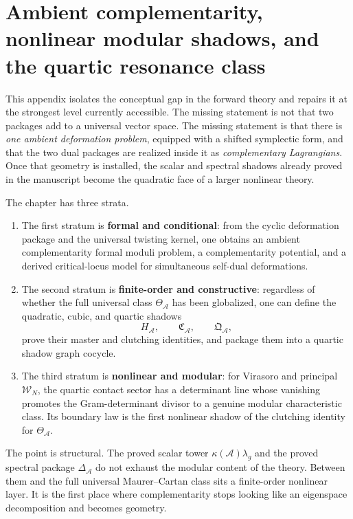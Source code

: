 \documentclass[11pt,oneside]{memoir}
\numberwithin{equation}{chapter}
\theoremstyle{definition}
\newcommand{\cA}{\mathcal A}
\begin{document}
\appendix

\chapter[Ambient complementarity and nonlinear modular shadows]{Ambient complementarity, nonlinear modular shadows, and the quartic resonance class}
\label{app:nonlinear-modular-shadows}

This appendix isolates the conceptual gap in the forward theory and repairs it at the strongest level currently accessible.  The missing statement is not that two packages add to a universal vector space.  The missing statement is that there is \emph{one ambient deformation problem}, equipped with a shifted symplectic form, and that the two dual packages are realized inside it as \emph{complementary Lagrangians}.  Once that geometry is installed, the scalar and spectral shadows already proved in the manuscript become the quadratic face of a larger nonlinear theory.

The chapter has three strata.
\begin{enumerate}[label=\textup{(\roman*)}]
\item The first stratum is \textbf{formal and conditional}: from the cyclic deformation package and the universal twisting kernel, one obtains an ambient complementarity formal moduli problem, a complementarity potential, and a derived critical-locus model for simultaneous self-dual deformations.
\item The second stratum is \textbf{finite-order and constructive}: regardless of whether the full universal class $\Theta_{\cA}$ has been globalized, one can define the quadratic, cubic, and quartic shadows
\[
H_{\cA},\qquad \mathfrak C_{\cA},\qquad \mathfrak Q_{\cA},
\]
prove their master and clutching identities, and package them into a quartic shadow graph cocycle.
\item The third stratum is \textbf{nonlinear and modular}: for Virasoro and principal $\mathcal W_N$, the quartic contact sector has a determinant line whose vanishing promotes the Gram-determinant divisor to a genuine modular characteristic class.  Its boundary law is the first nonlinear shadow of the clutching identity for $\Theta_{\cA}$.
\end{enumerate}

The point is structural.  The proved scalar tower $\kappa(\cA)\lambda_g$ and the proved spectral package $\Delta_{\cA}$ do not exhaust the modular content of the theory.  Between them and the full universal Maurer--Cartan class sits a finite-order nonlinear layer.  It is the first place where complementarity stops looking like an eigenspace decomposition and becomes geometry.
\end{document}
